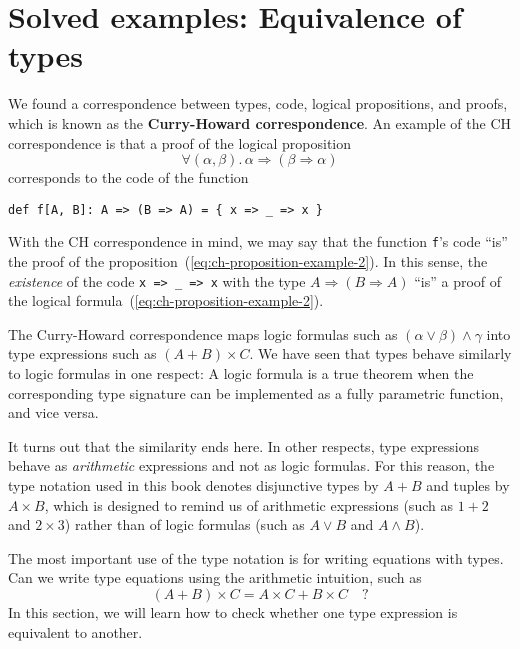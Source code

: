 \section{Solved examples: Equivalence of types}

We found a correspondence between types, code, logical propositions,
and proofs, which is known as the \textbf{Curry-Howard correspondence}.
An example of the CH correspondence is that a proof of the logical
proposition
\begin{equation}
\forall(\alpha,\beta).\,\alpha\Rightarrow\left(\beta\Rightarrow\alpha\right)\label{eq:ch-proposition-example-2}
\end{equation}
corresponds to the code of the function 
\begin{lstlisting}
def f[A, B]: A => (B => A) = { x => _ => x }
\end{lstlisting}
With the CH correspondence in mind, we may say that the function \lstinline!f!'s
code ``is'' the proof of the proposition~(\ref{eq:ch-proposition-example-2}).
In this sense, the \emph{existence} of the code \lstinline!x => _ => x!
with the type $A\Rightarrow(B\Rightarrow A)$ ``is'' a proof of
the logical formula~(\ref{eq:ch-proposition-example-2}).

The Curry-Howard correspondence maps logic formulas such as $(\alpha\vee\beta)\wedge\gamma$
into type expressions such as $\left(A+B\right)\times C$. We have
seen that types behave similarly to logic formulas in one respect:
A logic formula is a true theorem when the corresponding type signature
can be implemented as a fully parametric function, and vice versa.

It turns out that the similarity ends here. In other respects, type
expressions behave as \emph{arithmetic} expressions and not as logic
formulas. For this reason, the type notation used in this book denotes
disjunctive types by $A+B$ and tuples by $A\times B$, which is designed
to remind us of arithmetic expressions (such as $1+2$ and $2\times3$)
rather than of logic formulas (such as $A\vee B$ and $A\wedge B$). 

The most important use of the type notation is for writing equations
with types. Can we write type equations using the arithmetic intuition,
such as 
\begin{equation}
\left(A+B\right)\times C=A\times C+B\times C\quad?\label{eq:ch-example-distributive}
\end{equation}
In this section, we will learn how to check whether one type expression
is equivalent to another.

